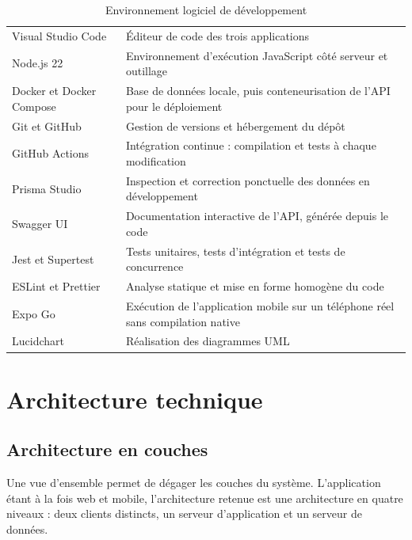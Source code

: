 \begin{table}[H]
\centering
\caption{Environnement logiciel de développement}
\label{tab:env-logiciel}
\begin{tabularx}{\textwidth}{L{4.2cm} X}
\toprule
{} &  \\
\midrule
Visual Studio Code & Éditeur de code des trois applications \\
Node.js 22 & Environnement d'exécution JavaScript côté serveur et outillage \\
Docker et Docker Compose & Base de données locale, puis conteneurisation de
l'API pour le déploiement \\
Git et GitHub & Gestion de versions et hébergement du dépôt \\
GitHub Actions & Intégration continue : compilation et tests à chaque
modification \\
Prisma Studio & Inspection et correction ponctuelle des données en
développement \\
Swagger UI & Documentation interactive de l'API, générée depuis le code \\
Jest et Supertest & Tests unitaires, tests d'intégration et tests de
concurrence \\
ESLint et Prettier & Analyse statique et mise en forme homogène du code \\
Expo Go & Exécution de l'application mobile sur un téléphone réel sans
compilation native \\
Lucidchart & Réalisation des diagrammes UML \\
\bottomrule
\end{tabularx}
\end{table}

\section{Architecture technique}

\subsection{Architecture en couches}

Une vue d'ensemble permet de dégager les couches du système. L'application
étant à la fois web et mobile, l'architecture retenue est une architecture en
quatre niveaux : deux clients distincts, un serveur d'application et un serveur
de données.



